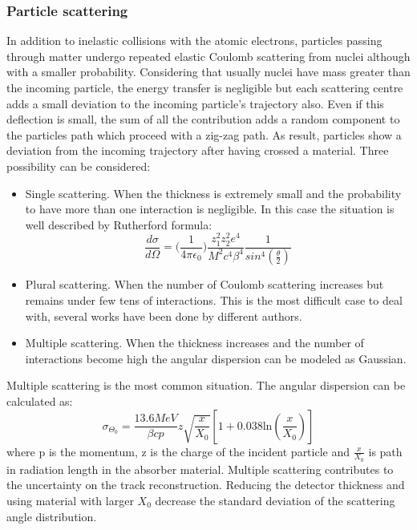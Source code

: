 \subsubsection{Particle scattering}
In addition to inelastic collisions with the atomic electrons, particles passing through matter undergo repeated elastic Coulomb scattering from nuclei although with a smaller probability.
Considering that usually nuclei have mass greater than the incoming particle, the energy transfer is negligible but each scattering centre adds a small deviation to the incoming particle's trajectory also. Even if this deflection is small, the sum of all the contribution adds a random component to the particles path which proceed with a zig-zag path. As result, particles show a deviation from the incoming trajectory after having crossed a material.
Three possibility can be considered:
\begin{itemize}
\item Single scattering. When the thickness is extremely small and the probability to have more than one interaction is negligible. In this case the situation is well described by Rutherford formula\cite{rutherford}: 
\begin{equation}
\frac{d\sigma}{d\Omega} = \big(\frac{1}{4\pi\epsilon_0} \big) \frac{ z_1^2 z_2^2 e^4}{M^2c^4\beta^4} \frac{1}{sin^4(\frac{\theta}{2})}
\end{equation}
\item	Plural scattering. When the number of Coulomb scattering increases but remains under few tens of interactions. This is the most difficult case to deal with, several works have been done by different authors\cite{plural_scattering}.
\item Multiple scattering\cite{multiple_scattering}. When the thickness increases and the number of interactions become high the angular dispersion can be modeled as Gaussian.
\end{itemize}
Multiple scattering is the most common situation. The angular dispersion can be calculated as:
\begin{equation}
\sigma_{\Theta_0} = \frac{13.6 MeV}{\beta c p}z \sqrt{\frac{x}{X_0}}[1+0.038\mathrm{ln}(\frac{x}{X_0})]
\label{eq:mult_scat}
\end{equation}
where p is the momentum, z is the charge of the incident particle and $\frac{x}{X_0}$ is path in radiation length in the absorber material.
Multiple scattering contributes to the uncertainty on the track reconstruction. Reducing the detector thickness and using material with larger $X_0$ decrease the standard deviation of the scattering angle distribution.

